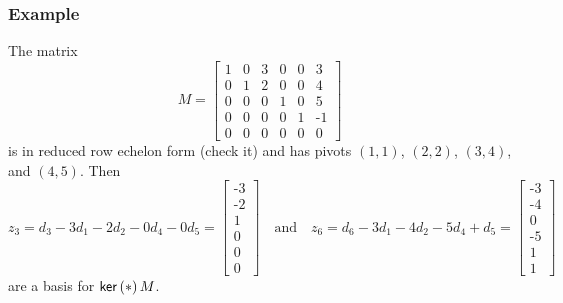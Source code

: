 \documentclass{memoir}
\begin{document}
\subsubsection*{Example}

The matrix \[ M = \left[ \begin{array}{cccccc} 1 & 0 & 3 & 0 & 0 & 3 \\ 0 & 1 & 2 & 0 & 0 & 4 \\ 0 & 0 & 0 & 1 & 0 & 5 \\ 0 & 0 & 0 & 0 & 1 & \text{-} 1 \\ 0 & 0 & 0 & 0 & 0 & 0 \end{array} \right] \] is in reduced row echelon form (check it) and has pivots $(1,1)$, $(2,2)$, $(3,4)$, and $(4,5)$. Then \[ z_3 = d_3 - 3d_1 - 2d_2 - 0d_4 - 0d_5 = \left[ \begin{array}{c} \text{-}3 \\ \text{-}2 \\ 1 \\ 0 \\ 0 \\ 0 \end{array} \right] \quad \mathrm{and} \quad z_6 = d_6 - 3d_1 - 4d_2 - 5d_4 + d_5 = \left[ \begin{array}{c} \text{-}3 \\ \text{-}4 \\ 0 \\ \text{-}5 \\ 1 \\ 1 \end{array} \right] \] are a basis for $\operatorname{\mathsf{ker}}\left(*\right){M}$.
\end{document}
